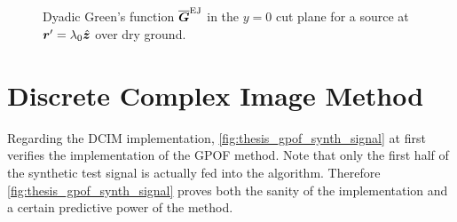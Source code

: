 \begin{figure}
        \caption[Dyadic Green's function $\dyad{G}^\mathrm{EJ}$ for a source at
        $\rsrc = \lambda_0 \uv{z}$ over dry ground]
        {Dyadic Green's function $\dyad{G}^\mathrm{EJ}$ in the
        $y = 0$ cut plane for a source at $\rsrc = \lambda_0 \uv{z}$ over dry
        ground.}
        \label{fig:dgf_G_EJ_full}
\end{figure}


\section{Discrete Complex Image Method}

Regarding the \ac{DCIM} implementation, \cref{fig:thesis_gpof_synth_signal}
at first verifies the implementation of the \ac{GPOF} method.
Note that only the first half of the synthetic test signal is actually
fed into the algorithm.
Therefore \cref{fig:thesis_gpof_synth_signal} proves both the sanity of the
implementation and a certain predictive power of the method.

